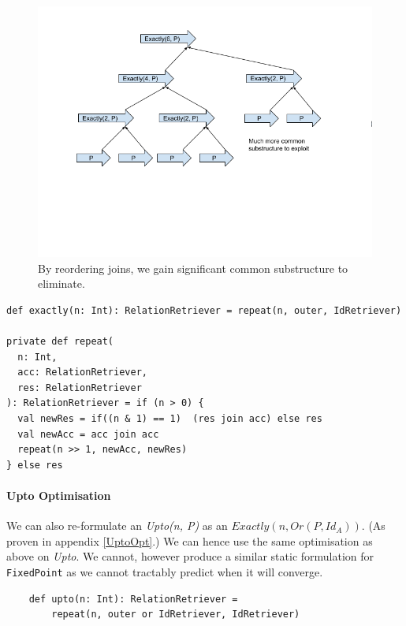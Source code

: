 \documentclass[12pt,a4paper,twoside,openright]{report}
\newcommand\codeName[1]{\texttt{#1}}
\newcommand\mathName[1]{\textit{#1}}
\renewcommand{\baselinestretch}{1.1}    %
\begin{document}
\begin{figure}[ht]
\centering
  \includegraphics[width=\textwidth]{figs/CommonJoins.png}
  \caption{By reordering joins, we gain significant common substructure to eliminate.}
  \label{fig:CommonJoins}
\end{figure}

\renewcommand{\baselinestretch}{0.8}
\begin{framed}
\begin{verbatim}
def exactly(n: Int): RelationRetriever = repeat(n, outer, IdRetriever)

private def repeat(
  n: Int,
  acc: RelationRetriever,
  res: RelationRetriever
): RelationRetriever = if (n > 0) {
  val newRes = if((n & 1) == 1)  (res join acc) else res
  val newAcc = acc join acc
  repeat(n >> 1, newAcc, newRes)
} else res
\end{verbatim}
\end{framed}
\renewcommand{\baselinestretch}{1.1}

		\paragraph{Upto Optimisation}
			We can also re-formulate an \mathName{Upto(n, P)} as an \mathName{$Exactly(n, Or(P, Id_A))$}. (As proven in appendix \ref{UptoOpt}.) We can hence use the same optimisation as above on \mathName{Upto}. We cannot, however produce a similar static formulation for \codeName{FixedPoint} as we cannot tractably predict when it will converge.
			
			\renewcommand{\baselinestretch}{0.8}
			\begin{framed}
			\begin{verbatim}			
    def upto(n: Int): RelationRetriever =
        repeat(n, outer or IdRetriever, IdRetriever)
			\end{verbatim}
			\end{framed}
			\renewcommand{\baselinestretch}{1.1}
\end{document}
